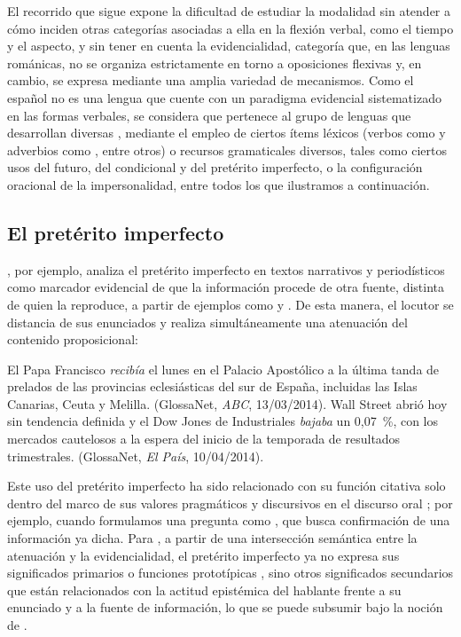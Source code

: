 El recorrido que sigue expone la dificultad de estudiar la modalidad sin atender
a cómo inciden otras categorías asociadas a ella en la flexión verbal, como el
tiempo y el aspecto, y sin tener en cuenta la evidencialidad, categoría que, en
las lenguas románicas, no se organiza estrictamente en torno a oposiciones
flexivas y, en cambio, se expresa mediante una amplia variedad de mecanismos.
Como el español no es una lengua que cuente con un paradigma evidencial
sistematizado en las formas verbales, se considera que pertenece al grupo de
lenguas que desarrollan diversas , mediante el
empleo de ciertos ítems léxicos (verbos como  y
adverbios como , entre otros) o
recursos gramaticales diversos, tales como ciertos usos del futuro, del
condicional y del pretérito imperfecto, o la configuración oracional de la
impersonalidad, entre todos los que ilustramos a continuación.

\subsection{El pretérito imperfecto}\label{sec:14-imperfecto}

\textcite[24]{hassler2017}, por ejemplo, analiza el pretérito imperfecto en
textos narrativos y periodísticos como marcador evidencial de que la información
procede de otra fuente, distinta de quien la reproduce, a partir de ejemplos
como  y . De esta manera, el locutor se
distancia de sus enunciados y realiza simultáneamente una atenuación del
contenido proposicional:

\begin{exe}
  \ex\label{ex:14-papa} El Papa Francisco \textit{recibía} el lunes en el
      Palacio Apostólico a la última tanda de prelados de las provincias
      eclesiásticas del sur de España, incluidas las Islas Canarias, Ceuta y
      Melilla. (GlossaNet, \textit{ABC}, 13/03/2014).
  \ex\label{ex:14-wall} Wall Street abrió hoy sin tendencia definida y el Dow
      Jones de Industriales \textit{bajaba} un 0,07~\%, con los mercados
      cautelosos a la espera del inicio de la temporada de resultados
      trimestrales. (GlossaNet, \textit{El País}, 10/04/2014).
\end{exe}

Este uso del pretérito imperfecto ha sido relacionado con su función citativa
solo dentro del marco de sus valores pragmáticos y discursivos en el discurso
oral \parencite{reyes1990}; por ejemplo, cuando formulamos una pregunta como
, que busca confirmación de una
información ya dicha. Para \textcite{hassler2017}, a partir de una intersección
semántica entre la atenuación y la evidencialidad, el pretérito imperfecto ya no
expresa sus significados primarios o funciones prototípicas
\parencite[véase][]{giammatteo2018trombetta}, sino otros significados
secundarios que están relacionados con la actitud epistémica del hablante frente
a su enunciado y a la fuente de información, lo que se puede subsumir bajo la
noción de .


